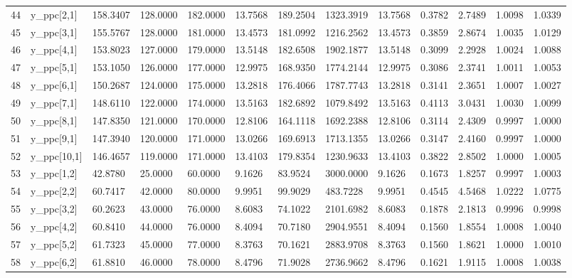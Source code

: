 \begin{table}[ht]
\begin{tabular}{rllllllllllll}
  44 & y\_ppc[2,1] & 158.3407 & 128.0000 & 182.0000 & 13.7568 &  189.2504 & 1323.3919 & 13.7568 & 0.3782 &  2.7489 & 1.0098 & 1.0339 \\ 
  45 & y\_ppc[3,1] & 155.5767 & 128.0000 & 181.0000 & 13.4573 &  181.0992 & 1216.2562 & 13.4573 & 0.3859 &  2.8674 & 1.0035 & 1.0129 \\ 
  46 & y\_ppc[4,1] & 153.8023 & 127.0000 & 179.0000 & 13.5148 &  182.6508 & 1902.1877 & 13.5148 & 0.3099 &  2.2928 & 1.0024 & 1.0088 \\ 
  47 & y\_ppc[5,1] & 153.1050 & 126.0000 & 177.0000 & 12.9975 &  168.9350 & 1774.2144 & 12.9975 & 0.3086 &  2.3741 & 1.0011 & 1.0053 \\ 
  48 & y\_ppc[6,1] & 150.2687 & 124.0000 & 175.0000 & 13.2818 &  176.4066 & 1787.7743 & 13.2818 & 0.3141 &  2.3651 & 1.0007 & 1.0027 \\ 
  49 & y\_ppc[7,1] & 148.6110 & 122.0000 & 174.0000 & 13.5163 &  182.6892 & 1079.8492 & 13.5163 & 0.4113 &  3.0431 & 1.0030 & 1.0099 \\ 
  50 & y\_ppc[8,1] & 147.8350 & 121.0000 & 170.0000 & 12.8106 &  164.1118 & 1692.2388 & 12.8106 & 0.3114 &  2.4309 & 0.9997 & 1.0000 \\ 
  51 & y\_ppc[9,1] & 147.3940 & 120.0000 & 171.0000 & 13.0266 &  169.6913 & 1713.1355 & 13.0266 & 0.3147 &  2.4160 & 0.9997 & 1.0000 \\ 
  52 & y\_ppc[10,1] & 146.4657 & 119.0000 & 171.0000 & 13.4103 &  179.8354 & 1230.9633 & 13.4103 & 0.3822 &  2.8502 & 1.0000 & 1.0005 \\ 
  53 & y\_ppc[1,2] &  42.8780 &  25.0000 &  60.0000 &  9.1626 &   83.9524 & 3000.0000 &  9.1626 & 0.1673 &  1.8257 & 0.9997 & 1.0003 \\ 
  54 & y\_ppc[2,2] &  60.7417 &  42.0000 &  80.0000 &  9.9951 &   99.9029 &  483.7228 &  9.9951 & 0.4545 &  4.5468 & 1.0222 & 1.0775 \\ 
  55 & y\_ppc[3,2] &  60.2623 &  43.0000 &  76.0000 &  8.6083 &   74.1022 & 2101.6982 &  8.6083 & 0.1878 &  2.1813 & 0.9996 & 0.9998 \\ 
  56 & y\_ppc[4,2] &  60.8410 &  44.0000 &  76.0000 &  8.4094 &   70.7180 & 2904.9551 &  8.4094 & 0.1560 &  1.8554 & 1.0008 & 1.0040 \\ 
  57 & y\_ppc[5,2] &  61.7323 &  45.0000 &  77.0000 &  8.3763 &   70.1621 & 2883.9708 &  8.3763 & 0.1560 &  1.8621 & 1.0000 & 1.0010 \\ 
  58 & y\_ppc[6,2] &  61.8810 &  46.0000 &  78.0000 &  8.4796 &   71.9028 & 2736.9662 &  8.4796 & 0.1621 &  1.9115 & 1.0008 & 1.0038 \\ 

\end{tabular}
\end{table}
